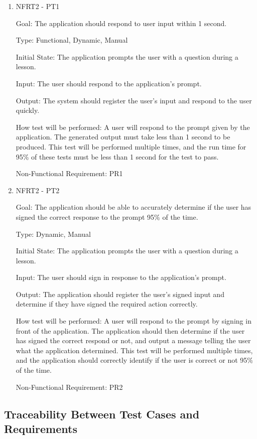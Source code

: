 \documentclass[12pt, titlepage]{article}
\begin{document}
\begin{enumerate}

\item{NFRT2 - PT1}

Goal: The application should respond to user input within 1 second. 

Type: Functional, Dynamic, Manual
					
Initial State: The application prompts the user with a question during a lesson. 
					
Input: The user should respond to the application's prompt.
					
Output: The system should register the user's input and respond to the user quickly. 
					
How test will be performed: A user will respond to the prompt given by the application. The generated output must take less than 1 second to be produced. This test will be performed multiple times, and the run time for 95\% of these tests must be less than 1 second for the test to pass. 

Non-Functional Requirement: PR1

\item{NFRT2 - PT2}

Goal: The application should be able to accurately determine if the user has signed the correct response to the prompt 95\% of the time. 

Type: Dynamic, Manual
					
Initial State: The application prompts the user with a question during a lesson. 
					
Input: The user should sign in response to the application's prompt.
					
Output: The application should register the user's signed input and determine if they have signed the required action correctly.
					
How test will be performed: A user will respond to the prompt by signing in front of the application. The application should then determine if the user has signed the correct respond or not, and output a message telling the user what the application determined. This test will be performed multiple times, and the application should correctly identify if the user is correct or not 95\% of the time.

Non-Functional Requirement: PR2

\end{enumerate}

\newpage

\subsection{Traceability Between Test Cases and Requirements}
\end{document}
